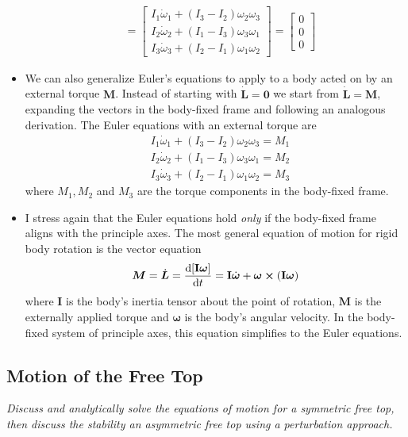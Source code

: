 \documentclass[11pt, a4paper]{article}
\newcommand{\bdot}[1]{\dot{\bm{#1}}}
\begin{document}
\begin{itemize}
\begin{align*}
		&=
		\begin{bmatrix}
			I_{1}{\dot  {\omega }}_{{1}} + (I_{3}-I_{2}) \omega_{2} \omega_{3}\\
			I_{2}{\dot  {\omega}}_{{2}} + (I_{1}-I_{3}) \omega_{3} \omega_{1}\\
			I_{3}{\dot  {\omega }}_{{3}} + (I_{2}-I_{1}) \omega _{1} \omega_{2}
		\end{bmatrix}
		=
		\begin{bmatrix}
			0\\
			0\\
			0
		\end{bmatrix}
	\end{align*}

	
	\item We can also generalize Euler's equations to apply to a body acted on by an external torque $ \bm{M}$. Instead of starting with $ \bdot{L} = \bm{0} $ we start from $ \bdot{L} = \bm{M} $, expanding the vectors in the body-fixed frame and following an analogous derivation. The Euler equations with an external torque are
	\begin{align*}
		&I_{1}{\dot{\omega}}_{{1}} + (I_{3}-I_{2}) \omega_{2}\omega_{3} = M_1\\
		&I_{2}{\dot{\omega}}_{{2}} + (I_{1}-I_{3}) \omega_{3}\omega_{1} = M_2\\
		&I_{3}{\dot{\omega}}_{{3}} + (I_{2}-I_{1}) \omega_{1}\omega_{2} = M_3
	\end{align*}
	where $ M_{1}, M_{2} $ and $ M_{3} $ are the torque components in the body-fixed frame.
	
	\item I stress again that the Euler equations hold \textit{only} if the body-fixed frame aligns with the principle axes. The most general equation of motion for rigid body rotation is the vector equation
	\begin{equation*}
		\bm{M} = \dot{\bm{L}} = \dv{[\mathbf{I} \bm{\omega}]}{t}  = \mathbf{I} \dot{\bm{\omega}} + \bm{\omega} \cross (\mathbf{I} \bm{\omega})
	\end{equation*}
	where $ \mathbf{I} $ is the body's inertia tensor about the point of rotation, $ \bm{M} $ is the externally applied torque and $ \bm{\omega} $ is the body's angular velocity. In the body-fixed system of principle axes, this equation simplifies to the Euler equations.

\end{itemize}


\subsection{Motion of the Free Top}
\textit{Discuss and analytically solve the equations of motion for a symmetric free top, then discuss the stability an asymmetric free top using a perturbation approach.}
\end{document}
